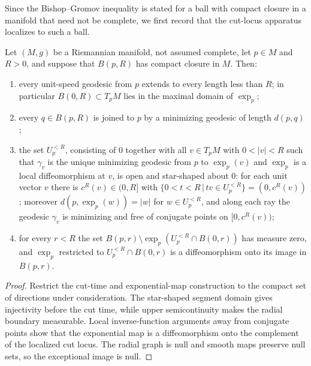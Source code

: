 Since the Bishop--Gromov inequality is stated for a ball with
compact closure in a manifold that need not be complete, we first
record that the cut-locus apparatus localizes to such a ball.

\begin{lemma}
\label{lem:localized-cut-locus}

Let $(M,g)$ be a Riemannian manifold, not assumed complete, let
$p\in M$ and $R>0$, and suppose that $B(p,R)$ has compact closure
in $M$. Then:
\begin{enumerate}
\item every unit-speed geodesic from $p$ extends to every length
less than $R$; in particular
$B(0,R)\subset T_pM$ lies in the maximal domain of $\exp_p$;
\item every $q\in B(p,R)$ is joined to $p$ by a minimizing geodesic
of length $d(p,q)$;
\item the set $U_p^{<R}$, consisting of $0$ together with all $v\in
T_pM$ with $0<|v|<R$ such that $\gamma_v$ is the unique minimizing
geodesic from $p$ to $\exp_p(v)$ and $\exp_p$ is a local
diffeomorphism at $v$, is open and star-shaped about $0$: for each
unit vector $v$ there is $c^R(v)\in(0,R]$ with $\{0<t<R\,|\,tv\in
U_p^{<R}\}=(0,c^R(v))$; moreover $d(p,\exp_p(w))=|w|$ for $w\in
U_p^{<R}$, and along each ray the geodesic $\gamma_v$ is minimizing
and free of conjugate points on $[0,c^R(v))$;
\item for every $r<R$ the set $B(p,r)\setminus
\exp_p\left(U_p^{<R}\cap B(0,r)\right)$ has measure zero, and
$\exp_p$ restricted to $U_p^{<R}\cap B(0,r)$ is a
diffeomorphism onto its image in $B(p,r)$.
\end{enumerate}
\end{lemma}

\begin{proof}
\sketch
{}
Restrict the cut-time and exponential-map construction to the compact set of directions under consideration. The star-shaped segment domain gives injectivity before the cut time, while upper semicontinuity makes the radial boundary measurable. Local inverse-function arguments away from conjugate points show that the exponential map is a diffeomorphism onto the complement of the localized cut locus. The radial graph is null and smooth maps preserve null sets, so the exceptional image is null.
\end{proof}

